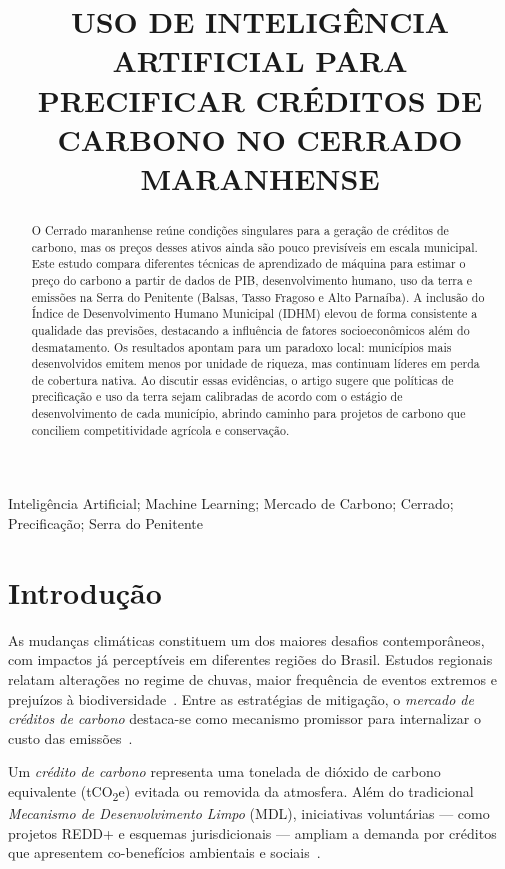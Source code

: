 \documentclass[conference]{IEEEtran}
\title{USO DE INTELIGÊNCIA ARTIFICIAL PARA PRECIFICAR CRÉDITOS DE CARBONO NO CERRADO MARANHENSE}
\author{%
\IEEEauthorblockN{Felipe de Oliveira Carvalho}
\IEEEauthorblockA{DEEE -- Department of Electrical Engineering/CCET\\
Federal University of Maranhão\\
São Luís, Brazil\\
ORCID: \href{https://orcid.org/0000-0003-0011-7404}{0000-0003-0011-7404}}
}
\begin{document}
\maketitle

\begin{abstract}
O Cerrado maranhense reúne condições singulares para a geração de créditos de carbono, mas os preços desses ativos ainda são pouco previsíveis em escala municipal. Este estudo compara diferentes técnicas de aprendizado de máquina para estimar o preço do carbono a partir de dados de PIB, desenvolvimento humano, uso da terra e emissões na Serra do Penitente (Balsas, Tasso Fragoso e Alto Parnaíba). A inclusão do Índice de Desenvolvimento Humano Municipal (IDHM) elevou de forma consistente a qualidade das previsões, destacando a influência de fatores socioeconômicos além do desmatamento. Os resultados apontam para um paradoxo local: municípios mais desenvolvidos emitem menos por unidade de riqueza, mas continuam líderes em perda de cobertura nativa. Ao discutir essas evidências, o artigo sugere que políticas de precificação e uso da terra sejam calibradas de acordo com o estágio de desenvolvimento de cada município, abrindo caminho para projetos de carbono que conciliem competitividade agrícola e conservação.
\end{abstract}

\begin{IEEEkeywords}
Inteligência Artificial; Machine Learning; Mercado de Carbono; Cerrado; Precificação; Serra do Penitente
\end{IEEEkeywords}

\section{Introdução}\label{sec:intro}

As mudanças climáticas constituem um dos maiores desafios contemporâneos, com impactos já perceptíveis em diferentes regiões do Brasil. Estudos regionais relatam alterações no regime de chuvas, maior frequência de eventos extremos e prejuízos à biodiversidade~\cite{silva2018percepcoes}. Entre as estratégias de mitigação, o \emph{mercado de créditos de carbono} destaca-se como mecanismo promissor para internalizar o custo das emissões~\cite{eibel2015}.

Um \emph{crédito de carbono} representa uma tonelada de dióxido de carbono equivalente (tCO\textsubscript{2}e) evitada ou removida da atmosfera. Além do tradicional \emph{Mecanismo de Desenvolvimento Limpo} (MDL), iniciativas voluntárias — como projetos REDD+ e esquemas jurisdicionais — ampliam a demanda por créditos que apresentem co-benefícios ambientais e sociais~\cite{cerradoRelat2024}.
\end{document}
